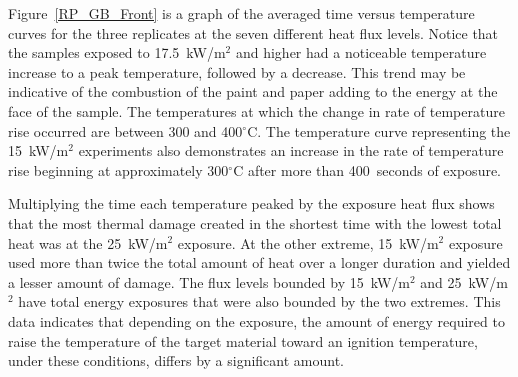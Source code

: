 \documentclass[twoside]{uocthesis}
\begin{document}
{Figure~\ref{RP_GB_Front} is a graph of the averaged time versus temperature curves for the three replicates at the seven different heat flux levels.  Notice that the samples exposed to 17.5~kW/m$^2$ and higher had a noticeable temperature increase to a peak temperature, followed by a decrease.  This trend may be indicative of the combustion of the paint and paper adding to the energy at the face of the sample. The temperatures at which the change in rate of temperature rise occurred are between 300 and 400$^{\circ}$C.  The temperature curve representing the 15~kW/m$^2$ experiments also demonstrates an increase in the rate of temperature rise beginning at approximately 300$^{\circ}$C after more than 400~seconds of exposure.  

Multiplying the time each temperature peaked by the exposure heat flux shows that the most thermal damage created in the shortest time with the lowest total heat was at the 25~kW/m$^2$ exposure.  At the other extreme, 15~kW/m$^2$ exposure used more than twice the total amount of heat over a longer duration and yielded a lesser amount of damage.  The flux levels bounded by 15~kW/m$^2$ and 25~kW/m$^2$ have total energy exposures that were also bounded by the two extremes. This data indicates that depending on the exposure, the amount of energy required to raise the temperature of the target material toward an ignition temperature, under these conditions, differs by a significant amount.        
  
}
\end{document}
